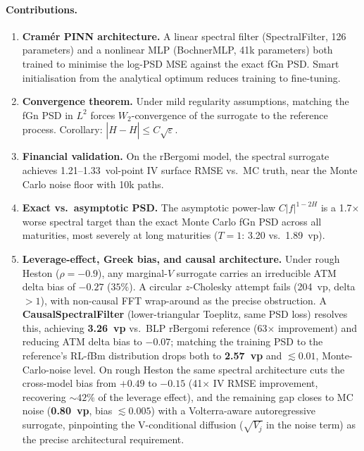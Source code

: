 \documentclass[11pt,a4paper]{article}
\begin{document}
\paragraph{Contributions.}
\begin{enumerate}
 \item \textbf{Cramér PINN architecture.} A linear spectral filter
  (SpectralFilter, 126 parameters) and a nonlinear MLP (BochnerMLP,
  41k parameters) both trained to minimise the log-PSD MSE against the
  exact fGn PSD. Smart initialisation from the analytical optimum
  reduces training to fine-tuning.

 \item \textbf{Convergence theorem.} Under mild regularity assumptions,
  matching the fGn PSD in $L^2$ forces $W_2$-convergence of the
  surrogate to the reference process. Corollary: $|\hat{H} - H| \leq
  C\sqrt{\varepsilon}$.

 \item \textbf{Financial validation.} On the rBergomi model, the
  spectral surrogate achieves 1.21--1.33~vol-point IV surface RMSE
  vs.\ MC truth, near the Monte Carlo noise floor with 10k paths.

 \item \textbf{Exact vs.\ asymptotic PSD.} The asymptotic power-law
  $C|f|^{1-2H}$ is a 1.7$\times$ worse spectral target than the
  exact Monte Carlo fGn PSD across all maturities, most severely at
  long maturities ($T=1$: 3.20 vs.\ 1.89~vp).

 \item \textbf{Leverage-effect, Greek bias, and causal architecture.}
  Under rough Heston ($\rho=-0.9$), any marginal-$V$ surrogate carries
  an irreducible ATM delta bias of $-0.27$ ($35\%$). A circular
  $z$-Cholesky attempt fails (204~vp, delta $>1$), with non-causal FFT
  wrap-around as the precise obstruction. A \textbf{CausalSpectralFilter}
  (lower-triangular Toeplitz, same PSD loss) resolves this, achieving
  \textbf{3.26~vp} vs.\ BLP rBergomi reference (63$\times$ improvement)
  and reducing ATM delta bias to $-0.07$; matching the training PSD to
  the reference's RL-fBm distribution drops both to \textbf{2.57~vp}
  and $\lesssim 0.01$, Monte-Carlo-noise level. On rough Heston the
  same spectral architecture cuts the cross-model bias from $+0.49$
  to $-0.15$ (41$\times$ IV RMSE improvement, recovering $\sim\!42\%$
  of the leverage effect), and the remaining gap closes to MC noise
  (\textbf{0.80~vp}, bias $\lesssim 0.005$) with a Volterra-aware
  autoregressive surrogate, pinpointing the V-conditional diffusion
  ($\sqrt{V_j}$ in the noise term) as the precise architectural
  requirement.


\end{enumerate}
\end{document}
